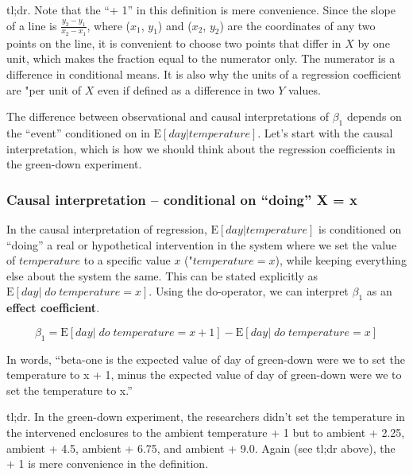 \documentclass[]{book}
\begin{document}
tl;dr. Note that the ``+ 1'' in this definition is mere convenience. Since the slope of a line is \(\frac{y_2 - y_1}{x_2 - x_1}\), where (\(x_1\), \(y_1\)) and (\(x_2\), \(y_2\)) are the coordinates of any two points on the line, it is convenient to choose two points that differ in \(X\) by one unit, which makes the fraction equal to the numerator only. The numerator is a difference in conditional means. It is also why the units of a regression coefficient are "per unit of \(X\) even if defined as a difference in two \(Y\) values.

The difference between observational and causal interpretations of \(\beta_1\) depends on the ``event'' conditioned on in \(\textrm{E}[day|temperature]\). Let's start with the causal interpretation, which is how we should think about the regression coefficients in the green-down experiment.

\hypertarget{causal-interpretation-conditional-on-doing-x-x}{%
\subsubsection{Causal interpretation -- conditional on ``doing'' X = x}\label{causal-interpretation-conditional-on-doing-x-x}}

In the causal interpretation of regression, \(\textrm{E}[day|temperature]\) is conditioned on ``doing'' a real or hypothetical intervention in the system where we set the value of \(temperature\) to a specific value \(x\) ("\(temperature=x\)), while keeping everything else about the system the same. This can be stated explicitly as \(\textrm{E}[day|\;do\;temperature = x]\). Using the do-operator, we can interpret \(\beta_1\) as an \textbf{effect coefficient}.

\begin{equation}
\beta_1 = \textrm{E}[day|\;do\;temperature = x+1] - \textrm{E}[day|\;do\;temperature = x]
\end{equation}

In words, ``beta-one is the expected value of day of green-down were we to set the temperature to x + 1, minus the expected value of day of green-down were we to set the temperature to x.''

tl;dr. In the green-down experiment, the researchers didn't set the temperature in the intervened enclosures to the ambient temperature + 1 but to ambient + 2.25, ambient + 4.5, ambient + 6.75, and ambient + 9.0. Again (see tl;dr above), the + 1 is mere convenience in the definition.
\end{document}
